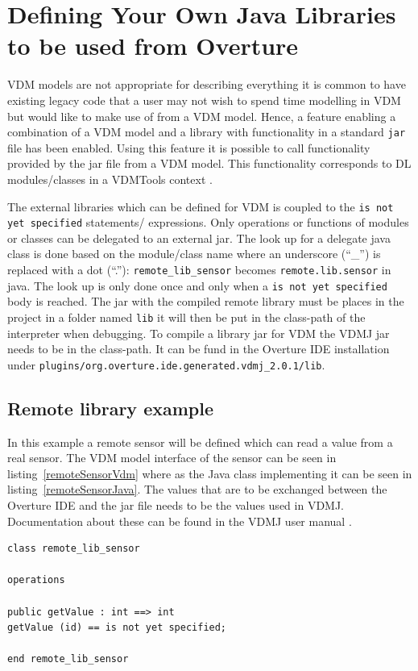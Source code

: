 \documentclass{overturerepchap}
\begin{document}
\chapter{Defining Your Own Java Libraries to be used from Overture}\label{sec:javalibs}

VDM models are not appropriate for describing everything it is common to have existing legacy code that a user may not
wish to spend time modelling in VDM but would like to make use of
from a VDM model. Hence, a feature enabling a combination of a VDM
model and a library with functionality in a standard \texttt{jar} file
has been enabled. Using this feature it is possible 
to call functionality provided by the jar file from a VDM model. This functionality
corresponds to DL modules/classes in a VDMTools context \cite{DLMan}.

The external libraries which can be defined for VDM is coupled to the
\texttt{is not yet specified} statements/ expressions. Only operations
or functions of modules or classes can be delegated to an external
jar. The look up for a delegate java class is done based on the
module/class name where an underscore (``\_'') is replaced with a dot
(``.''): \texttt{remote\_lib\_sensor} becomes
\texttt{remote.lib.sensor} in java. The look up is only done once and
only when a \texttt{is not yet specified} body is
reached. The jar with the compiled remote library must be places in
the project in a folder named \texttt{lib} it will then be put in the
class-path of the interpreter when debugging. To compile a library jar
for VDM the VDMJ jar needs to be in the class-path. It can be fund in
the Overture IDE installation under
\texttt{plugins/org.overture.ide.generated.vdmj\_2.0.1/lib}.

\section{Remote library example}

In this example a remote sensor will be defined which can read a
value from a real sensor. The VDM model interface of the sensor can be
seen in listing~\ref{remoteSensorVdm} where as the Java class
implementing it can be seen in listing~\ref{remoteSensorJava}. The
values that are to be exchanged between the Overture IDE and the jar
file needs to be the values used in VDMJ. Documentation about these
can be found in the VDMJ user manual \cite{Battle09}.

\begin{lstlisting}[language=VDM++,label=remoteSensorVdm,caption=Remote sensor VDM class,captionpos=b]
class remote_lib_sensor

operations

public getValue : int ==> int
getValue (id) == is not yet specified;

end remote_lib_sensor
\end{lstlisting}
\end{document}

